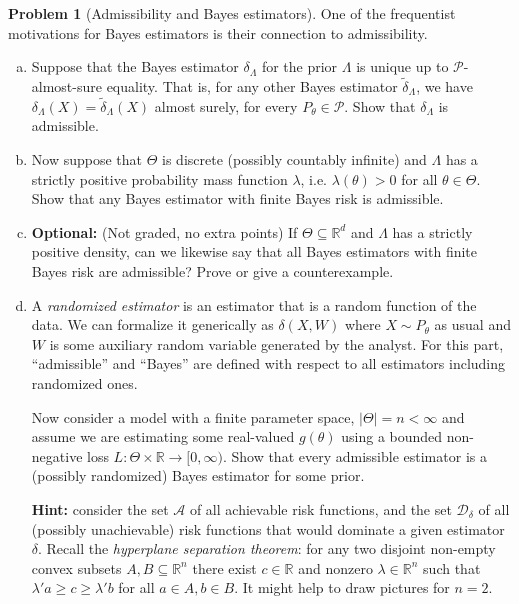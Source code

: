 \documentclass{article}
\newcommand{\cP}{\mathcal{P}}
\newcommand{\RR}{\mathbb{R}}
\newcommand{\optional}{{\bf Optional:} (Not graded, no extra points) }
\theoremstyle{definition}
\newtheorem{problem}{Problem}
\begin{document}
\begin{problem}[Admissibility and Bayes estimators]

One of the frequentist motivations for Bayes estimators is their connection to admissibility.

\begin{enumerate}[(a)]
\item Suppose that the Bayes estimator $\delta_{\Lambda}$ for the prior $\Lambda$ is unique up to $\cP$-almost-sure equality. That is, for any other Bayes estimator $\tilde\delta_{\Lambda}$, we have $\delta_\Lambda(X) = \tilde\delta_\Lambda(X)$ almost surely, for every $P_\theta\in\cP$. Show that $\delta_\Lambda$ is admissible.



\item Now suppose that $\Theta$ is discrete (possibly countably infinite) and $\Lambda$ has a strictly positive probability mass function $\lambda$, i.e. $\lambda(\theta) > 0$ for all $\theta\in \Theta$. Show that any Bayes estimator with finite Bayes risk is admissible.



\item \optional If $\Theta \subseteq \RR^d$ and $\Lambda$ has a strictly positive density, can we likewise say that all Bayes estimators with finite Bayes risk are admissible? Prove or give a counterexample.



\item A {\em randomized estimator} is an estimator that is a random function of the data. We can formalize it generically as $\delta(X,W)$ where $X\sim P_\theta$ as usual and $W$ is some auxiliary random variable generated by the analyst. For this part, ``admissible'' and ``Bayes'' are defined with respect to all estimators including randomized ones.

Now consider a model with a finite parameter space, $|\Theta|=n<\infty$ and assume we are estimating some real-valued $g(\theta)$ using a bounded non-negative loss $L:\Theta \times \RR \to [0,\infty)$. Show that every admissible estimator is a (possibly randomized) Bayes estimator for some prior.

{\bf Hint:} consider the set $\mathcal{A}$ of all achievable risk functions, and the set $\mathcal{D}_\delta$ of all (possibly unachievable) risk functions that would dominate a given estimator $\delta$. Recall the {\em hyperplane separation theorem}: for any two disjoint non-empty convex subsets $A,B\subseteq\RR^n$ there exist $c\in\RR$ and nonzero $\lambda\in\RR^n$ such that $\lambda'a \geq c \geq \lambda'b$ for all $a\in A, b\in B$. It might help to draw pictures for $n=2$.




\end{enumerate}
\end{problem}
\end{document}
